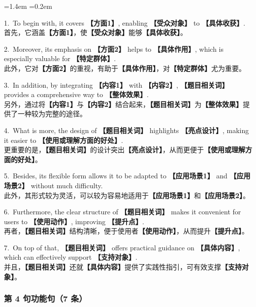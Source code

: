 \documentclass[11pt,a4paper]{ctexart}
\newcommand{\fillin}[1]{{\bfseries【#1】}}
\newenvironment{eg}{%
  \par\addvspace{4pt}%
  \begin{list}{}{\leftmargin=1.4em \rightmargin=0.2em \listparindent=0pt
    \itemindent=0pt \topsep=0pt \parsep=2pt \itemsep=2pt \partopsep=0pt}%
  \item\relax
}{%
  \end{list}\addvspace{5pt}%
}
\begin{document}
\begin{eg}
1.\ To begin with, it covers \fillin{方面1}, enabling \fillin{受众对象} to \fillin{具体收获}.\\
首先，它涵盖\fillin{方面1}，使\fillin{受众对象}能够\fillin{具体收获}。

2.\ Moreover, its emphasis on \fillin{方面2} helps to \fillin{具体作用}, which is especially valuable for \fillin{特定群体}.\\
此外，它对\fillin{方面2}的重视，有助于\fillin{具体作用}，对\fillin{特定群体}尤为重要。

3.\ In addition, by integrating \fillin{内容1} with \fillin{内容2}, \fillin{题目相关词} provides a comprehensive way to \fillin{整体效果}.\\
另外，通过将\fillin{内容1}与\fillin{内容2}结合起来，\fillin{题目相关词}为\fillin{整体效果}提供了一种较为完整的途径。

4.\ What is more, the design of \fillin{题目相关词} highlights \fillin{亮点设计}, making it easier to \fillin{使用或理解方面的好处}.\\
更重要的是，\fillin{题目相关词}的设计突出\fillin{亮点设计}，从而更便于\fillin{使用或理解方面的好处}。

5.\ Besides, its flexible form allows it to be adapted to \fillin{应用场景1} and \fillin{应用场景2} without much difficulty.\\
此外，其形式较为灵活，可以较为容易地适用于\fillin{应用场景1}和\fillin{应用场景2}。

6.\ Furthermore, the clear structure of \fillin{题目相关词} makes it convenient for users to \fillin{使用动作}, improving \fillin{提升点}.\\
再者，\fillin{题目相关词}结构清晰，便于使用者\fillin{使用动作}，从而提升\fillin{提升点}。

7.\ On top of that, \fillin{题目相关词} offers practical guidance on \fillin{具体内容}, which can effectively support \fillin{支持对象}.\\
并且，\fillin{题目相关词}还就\fillin{具体内容}提供了实践性指引，可有效支撑\fillin{支持对象}。
\end{eg}

\subsubsection{第 4 句功能句（7 条）}
\end{document}
